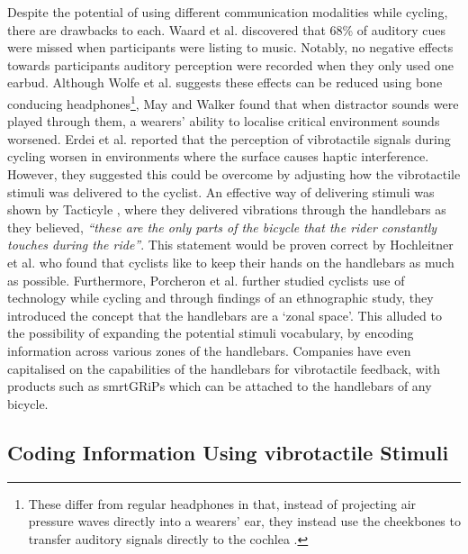 \documentclass{interim}
\begin{document}
Despite the potential of using different communication modalities while cycling, there are drawbacks to each. Waard et al. \cite{DEWAARD2011626} discovered that 68\% of auditory cues were missed when participants were listing to music. Notably, no negative effects towards participants auditory perception were recorded when they only used one earbud. Although Wolfe et al. \cite{wolfe2016distracted} suggests these effects can be reduced using bone conducing headphones\footnote{These differ from regular headphones in that, instead of projecting air pressure waves directly into a wearers' ear, they instead use the cheekbones to transfer auditory signals directly to the cochlea \cite{littler1952hearing}.}, May and Walker \cite{may2017effects} found that when distractor sounds were played through them, a wearers' ability to localise critical environment sounds worsened. Erdei et al. \cite{erdei2020comparing, doi:10.1080/15389588.2021.1985113} reported that the perception of vibrotactile signals during cycling worsen in environments where the surface causes haptic interference. However, they suggested this could be overcome by adjusting how the vibrotactile stimuli was delivered to the cyclist. An effective way of delivering stimuli was shown by Tacticyle \cite{10.1145/2371574.2371631}, where they delivered vibrations through the handlebars as they believed, \textit{“these are the only parts of the bicycle that the rider constantly touches during the ride”}. This statement would be proven correct by Hochleitner et al. \cite{10.1145/3152832.3152871} who found that cyclists like to keep their hands on the handlebars as much as possible. Furthermore, Porcheron et al. \cite{10.1145/3544548.3580971} further studied cyclists use of technology while cycling and through findings of an ethnographic study, they introduced the concept that the handlebars are a ‘zonal space’. This alluded to the possibility of expanding the potential stimuli vocabulary, by encoding information across various zones of the handlebars. Companies have even capitalised on the capabilities of the handlebars for vibrotactile feedback, with products such as smrtGRiPs \cite{smartgrips} which can be attached to the handlebars of any bicycle.


\subsection{Coding Information Using vibrotactile Stimuli}
\end{document}
